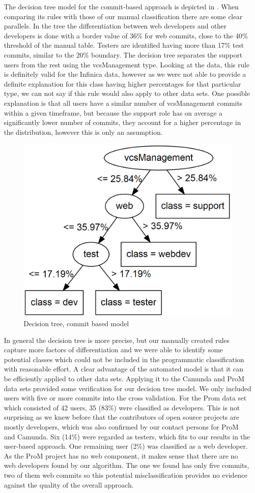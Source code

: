 The decision tree model for the commit-based approach is depicted in . When comparing its rules with those of our manual classification there are some clear parallels. In the tree the differentiation between web developers and other developers is done with a border value of 36\% for web commits, close to the 40\% threshold of the manual table. Testers are identified having more than 17\% test commits, similar to the 20\% boundary. The decision tree separates the support users from the rest using the vcsManagement type. Looking at the data, this rule is definitely valid for the Infinica data, however as we were not able to provide a definite explanation for this class having higher percentages for that particular type, we can not say if this rule would also apply to other data sets. One possible explanation is that all users have a similar number of vcsManagement commits within a given timeframe, but because the support role has on average a significantly lower number of commits, they account for a higher percentage in the distribution, however this is only an assumption.

\begin{figure}
	\centering
	\includegraphics[width=0.6\columnwidth]{ResourceClassification/figures/commit_tree.png}
	\caption{Decision tree, commit based model}
	\label{fig:tree}
\end{figure}

In general the decision tree is more precise, but our manually created rules capture more factors of differentiation and we were able to identify some potential classes which could not be included in the programmatic classification with reasonable effort. A clear advantage of the automated model is that it can be efficiently applied to other data sets. Applying it to the Camunda and ProM data sets provided some verification for our decision tree model. We only included users with five or more commits into the cross validation. For the Prom data set which consisted of 42 users, 35 (83\%) were classified
as developers. This is not surprising as we knew before that the contributors
of open source projects are mostly developers, which was also confirmed by our
contact persons for ProM and Camunda. Six (14\%) were regarded as testers,
which fits to our results in the user-based approach. One remaining user (2\%) was classified as a web developer. As the ProM project has no web component, it makes sense that there are no web developers found by our algorithm. The one we found has only five commits, two of them web commits so this potential misclassification provides no evidence against the quality of the overall approach.

